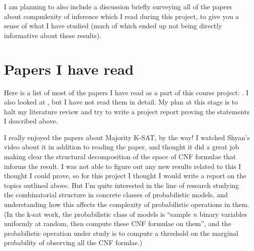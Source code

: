 \documentclass{article}
\theoremstyle{definition}
\theoremstyle{remark}
\begin{document}

I am planning to also include a discussion briefly surveying all of the papers about compmlexity of inference which I read during this project, to give you a sense of what I have studied (much of which ended up not being directly informative about these results).


\section{Papers I have read}
Here is a list of most of the papers I have read as a part of this course project: \cite{jerrum1986, cooper1990, dagum1993, dagum1997optimal, ackerman2019computability, kwisthout2018approximate, akmal2022majority, tantau2022satisfaction, aaronson2014equivalence}.
I also looked at \cite{feige2002relations, moitra2019approximate}, but I have not read them in detail.
My plan at this stage is to halt my literature review and try to write a project report
proving the statements I described above.

I really enjoyed the papers about Majority K-SAT, by the way!
I watched Shyan's video about it in addition to reading the paper, and thought it did a great job making clear the structural decomposition of the space of CNF formulae that informs the result.
I was not able to figure out any new results related to this I thought I could prove, so for this project I thought I would write a report on the topics outlined above.
But I'm quite interested in the line of research studying the combinatorial structure in concrete classes of probabilistic models, and understanding how this affects the complexity of probabilistic operations in them.
(In the k-sat work, the probabilistic class of models is ``sample $n$ binary variables uniformly at random, then compute these CNF formulae on them'', and the probabilistic operation under study is to compute a threshold on the marginal probability of observing all the CNF formlae.)

\printbibliography
\end{document}
